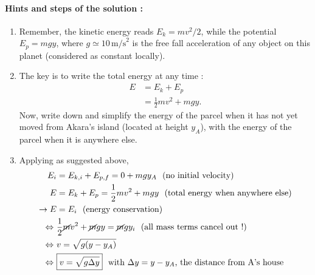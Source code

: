 \documentclass{article}
\begin{document}
\begin{tcolorbox}

\paragraph{Hints and steps of the solution : }

\begin{enumerate}

\item Remember, the kinetic energy reads $E_k=m v^2/2$, while the potential $E_p=m g y$, where $g\simeq 10 \,\text{m/s}^2$ is the free fall acceleration of any object on this planet (considered as constant locally).



\item The key is to write the total energy at any time :
\begin{align}
E &= E_k + E_p\nonumber\\
&= \frac 12  mv^2 + m g y.\nonumber
\end{align}
Now, write down and simplify the energy of the parcel when it has not yet moved from Akara's island (located at height $y_A$), with the energy of the parcel when it is anywhere else.

\item Applying as suggested above,
\begin{align}
E_i &= E_{k,i} + E_{p,f}  = 0 + mgy_A ~~\text{(no initial velocity)}\nonumber\\
E &= E_{k} + E_{p} = \frac 12  mv^2 + m g y ~~\text{(total energy when anywhere else)}\nonumber\\
\rightarrow E &= E_i \nonumber~~\text{(energy conservation)} \\
\Leftrightarrow~& \frac 12  \cancel{m}v^2 + \cancel{m} g y = \cancel{m}gy_i~~\text{(all mass terms cancel out !)}\nonumber \\
\Leftrightarrow~& v = \sqrt{g (y - y_A)}\nonumber\\
\Leftrightarrow~& \boxed{v = \sqrt{g \Delta y}}\nonumber ~~\text{with $\Delta y=y - y_A$, the distance from A's house}
\end{align}

\end{enumerate}
\end{tcolorbox}
~
\end{document}
